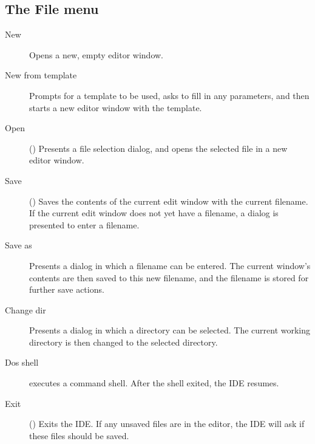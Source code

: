 \subsection{The File menu}
\label{se:menufile}
\begin{description}
\item[New] Opens a new, empty editor window. 
\item[New from template] Prompts for a template to be used, asks to fill in
any parameters, and then starts a new editor window with the template.
\item[Open] () Presents a file selection dialog, and opens 
the selected file in a new editor window. 
\item[Save] () Saves the contents of the current edit window 
with the current filename. If the current edit window does not yet have
a filename, a dialog is presented to enter a filename.
\item[Save as] Presents a dialog in which a filename can be entered. The
current window's contents are then saved to this new filename, and the
filename is stored for further save actions.
\item[Change dir] Presents a dialog in which a directory can be selected.
The current working directory is then changed to the selected directory.
\item[Dos shell] executes a command shell. After the shell exited, the
IDE resumes.
\item[Exit] () Exits the IDE. If any unsaved files are 
in the editor, the IDE will ask if these files should be saved.
\end{description}
%
%

